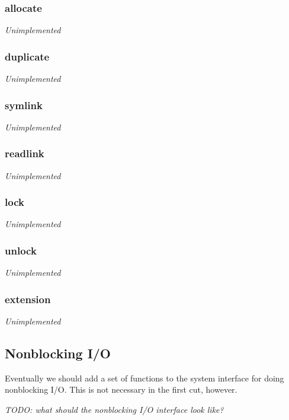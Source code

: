 \documentclass[11pt, letterpaper]{article}
\begin{document}
\subsubsection{allocate}
\emph{Unimplemented}

\subsubsection{duplicate}
\emph{Unimplemented}

\subsubsection{symlink}
\emph{Unimplemented}

\subsubsection{readlink}
\emph{Unimplemented}

\subsubsection{lock}
\emph{Unimplemented}

\subsubsection{unlock}
\emph{Unimplemented}

\subsubsection{extension}
\emph{Unimplemented}

\subsection{Nonblocking I/O}

Eventually we should add a set of functions to the system interface for
doing nonblocking I/O.  This is not necessary in the first cut, however.

\emph{TODO: what should the nonblocking I/O interface look like?}
\end{document}
